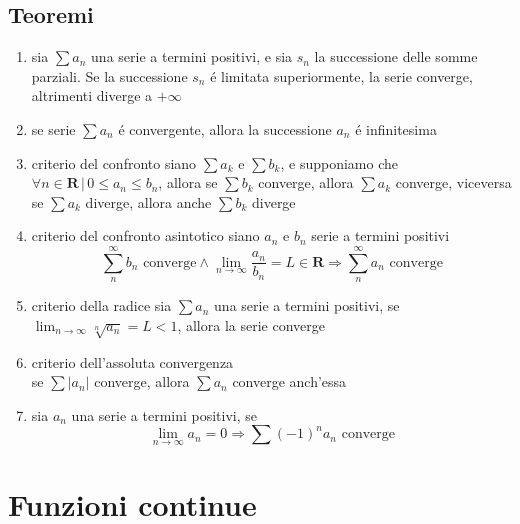 \documentclass{exam}
\begin{document}
 \subsection{Teoremi}
  \begin{enumerate}
    \item
      sia $\sum a_{n}$ una serie a termini positivi, e sia $s_{n}$ la successione delle somme parziali. Se la successione $s_{n}$ \'e limitata superiormente, la serie converge, altrimenti diverge a $+\infty$
    \item
      se serie $\sum a_{n}$ \'e convergente, allora la successione $a_{n}$ \'e infinitesima
    \item{criterio del confronto}\newline
      siano $\sum a_{k}$ e $\sum b_{k}$, e supponiamo che $\forall n\in \mathbf{R}\,|\, 0\le
      a_{n}\le b_{n}$, allora se $\sum b_{k}$ converge, allora $\sum a_{k}$ converge, viceversa se $\sum a_{k}$ diverge, allora anche $\sum b_{k}$ diverge
    \item{criterio del confronto asintotico}\newline
      siano $a_{n}$ e $b_{n}$ serie a termini positivi
      \begin{displaymath} 
        \sum_{n}^\infty b_{n} \textrm{ converge}\land \lim_{n\to \infty}\frac{a_{n}}{b_{n}}=L\in \mathbf{R} \Rightarrow \sum_{n}^\infty a_{n} \textrm{ converge}
      \end{displaymath}
    \item{criterio della radice}\newline
      sia $\sum a_{n}$ una serie a termini positivi, se \(\displaystyle \lim_{n\to \infty}\sqrt[n]{a_{n}}=L<1\), allora la serie converge
    \item{criterio dell'assoluta convergenza}\\
      se $\sum |a_{n}|$ converge, allora $\sum a_{n}$ converge anch'essa
    \item
      sia $a_{n}$ una serie a termini positivi, se
      \begin{displaymath}
        \lim_{n\to \infty}a_{n}=0\Rightarrow \sum {(-1)}^{n}a_{n} \textrm{ converge}
      \end{displaymath}
  \end{enumerate}
  \newpage





\section{Funzioni continue}
\end{document}
